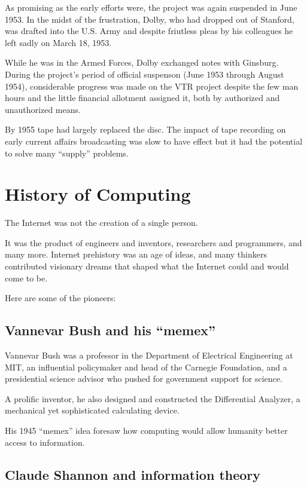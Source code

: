 \documentclass[UKenglish]{ifimaster}  %
\begin{document}
As promising as the early efforts were, the project was again
suspended in June 1953.  In the midst of the frustration, Dolby, who
had dropped out of Stanford, was drafted into the U.S. Army and
despite friutless pleas by his colleagues he left sadly on March 18,
1953.

While he was in the Armed Forces, Dolby exchanged notes with Ginsburg.
During the project's period of official suspenson (June 1953 through
August 1954), considerable progress was made on the VTR project
despite the few man hours and the little financial allotment assigned
it, both by authorized and unauthorized means.

By 1955 tape had largely replaced the disc.  The impact of tape
recording on early current affairs broadcasting was slow to have
effect but it had the potential to solve many ``supply'' problems.

\section{History of Computing}

The Internet was not the creation of a single person.

It was the product of engineers and inventors, researchers and programmers,
and many more.  Internet prehistory was an age of ideas, and many thinkers
contributed visionary dreams that shaped what the Internet could and would
come to be.

Here are some of the pioneers:

\subsection{Vannevar Bush and his ``memex''}

Vannevar Bush was a professor in the Department of Electrical
Engineering at MIT, an influential policymaker and head of the
Carnegie Foundation, and a presidential science advisor who pushed for
government support for science.

A prolific inventor, he also designed and constructed the Differential
Analyzer, a mechanical yet sophisticated calculating device.

His 1945 ``memex'' idea foresaw how computing would allow humanity
better access to information.

\subsection{Claude Shannon and information theory}
\end{document}
